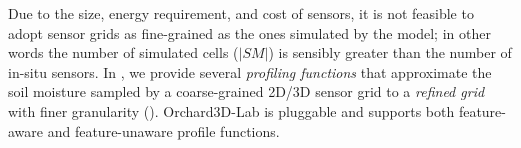 Due to the size, energy requirement, and cost of sensors, it is not feasible to adopt sensor grids as fine-grained as the ones simulated by the model; in other words the number of simulated cells ($|SM|$) is sensibly greater than the number of in-situ sensors.
In
, we provide several \textit{profiling functions} that approximate the soil moisture sampled by a coarse-grained 2D/3D sensor grid to a \textit{refined grid} with finer granularity ().
Orchard3D-Lab is pluggable and supports both feature-aware and feature-unaware profile functions.



